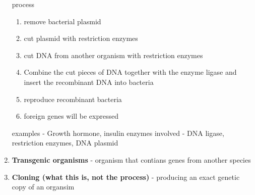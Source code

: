 \documentclass[9pt]{article}
\begin{document}
\begin{enumerate}
  process
  \begin{enumerate}
    \item remove bacterial plasmid
    \item cut plasmid with restriction enzymes
    \item cut DNA from another organism with restriction enzymes
    \item Combine the cut pieces of DNA together with the enzyme ligase and insert the recombinant DNA into bacteria
    \item reproduce recombinant bacteria
    \item foreign genes will be expressed
  \end{enumerate}
  examples - Growth hormone, insulin
  enzymes involved - DNA ligase, restriction enzymes, DNA plasmid
  \item {\bf Transgenic organisms} - organism that contians genes from another species
  \item {\bf Cloning (what this is, not the process)} - producing an exact genetic copy of an organsim
\end{enumerate}
\end{document}
